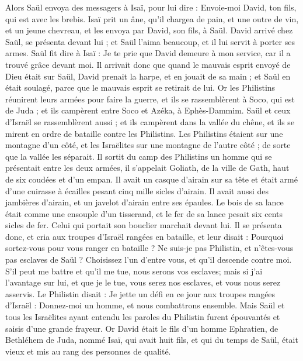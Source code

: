 \begin{multicols}{2}
Alors Saül envoya des messagers à Isaï, pour lui dire : Envoie-moi David, ton fils, qui est avec les brebis.
Isaï prit un âne, qu'il chargea de pain, et une outre de vin, et un jeune chevreau, et les envoya par David, son fils, à Saül.
David arrivé chez Saül, se présenta devant lui ; et Saül l'aima beaucoup, et il lui servit à porter ses armes.
Saül fit dire à Isaï : Je te prie que David demeure à mon service, car il a trouvé grâce devant moi.
Il arrivait donc que quand le mauvais esprit envoyé de Dieu était sur Saül, David prenait la harpe, et en jouait de sa main ; et Saül en était soulagé, parce que le mauvais esprit se retirait de lui.
\VerseOne{}Or les Philistins réunirent leurs armées pour faire la guerre, et ils se rassemblèrent à Soco, qui est de Juda ; et ils campèrent entre Soco et Azéka, à Ephès-Dammim.
Saül et ceux d'Israël se rassemblèrent aussi ; et ils campèrent dans la vallée du chêne, et ils se mirent en ordre de bataille contre les Philistins.
Les Philistins étaient sur une montagne d'un côté, et les Israëlites sur une montagne de l'autre côté ; de sorte que la vallée les séparait.
Il sortit du camp des Philistins un homme qui se présentait entre les deux armées, il s'appelait Goliath, de la ville de Gath, haut de six coudées et d'un empan.
Il avait un casque d'airain sur sa tête et était armé d'une cuirasse à écailles pesant cinq mille sicles d'airain.
Il avait aussi des jambières d'airain, et un javelot d'airain entre ses épaules.
Le bois de sa lance était comme une ensouple d'un tisserand, et le fer de sa lance pesait six cents sicles de fer. Celui qui portait son bouclier marchait devant lui.
Il se présenta donc, et cria aux troupes d'Israël rangées en bataille, et leur disait : Pourquoi sortez-vous pour vous ranger en bataille ? Ne suis-je pas Philistin, et n'êtes-vous pas esclaves de Saül ? Choisissez l'un d'entre vous, et qu'il descende contre moi.
S'il peut me battre et qu'il me tue, nous serons vos esclaves; mais si j'ai l'avantage sur lui, et que je le tue, vous serez nos esclaves, et vous nous serez asservis.
Le Philistin disait : Je jette un défi en ce jour aux troupes rangées d'Israël : Donnez-moi un homme, et nous combattrons ensemble.
Mais Saül et tous les Israëlites ayant entendu les paroles du Philistin furent épouvantés et saisis d'une grande frayeur.
Or David était le fils d'un homme Ephratien, de Bethléhem de Juda, nommé Isaï, qui avait huit fils, et qui du temps de Saül, était vieux et mis au rang des personnes de qualité.

\end{multicols}
